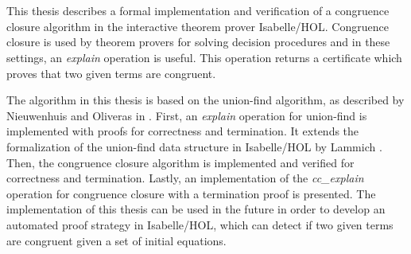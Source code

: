 \chapter{\abstractname}

This thesis describes a formal implementation and verification of a congruence closure algorithm in the interactive theorem prover Isabelle/HOL.
Congruence closure is used by theorem provers for solving decision procedures and in these settings, an \emph{explain} operation is useful. This operation returns a certificate which proves that two given terms are congruent.

The algorithm in this thesis is based on the union-find algorithm, as described by Nieuwenhuis and Oliveras in \cite{Nieuwenhuis}.
First, an \emph{explain} operation for union-find is implemented with proofs for correctness and termination. It extends the formalization of the union-find data structure in Isabelle/HOL by Lammich \cite{unionfind-isabelle}.
Then, the congruence closure algorithm is implemented and verified for correctness and termination.
Lastly, an implementation of the \emph{cc\_explain} operation for congruence closure with a termination proof is presented.
The implementation of this thesis can be used in the future in order to develop an automated proof strategy in Isabelle/HOL, which can detect if two given terms are congruent given a set of initial equations.
